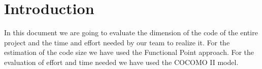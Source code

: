 \chapter{Introduction} \label{chap1}
In this document we are going to evaluate the dimension of the code of the entire project and the time and effort needed by our team to realize it. For the estimation of the code size we have used the Functional Point approach. For the evaluation of effort and time needed we have used the COCOMO II model.